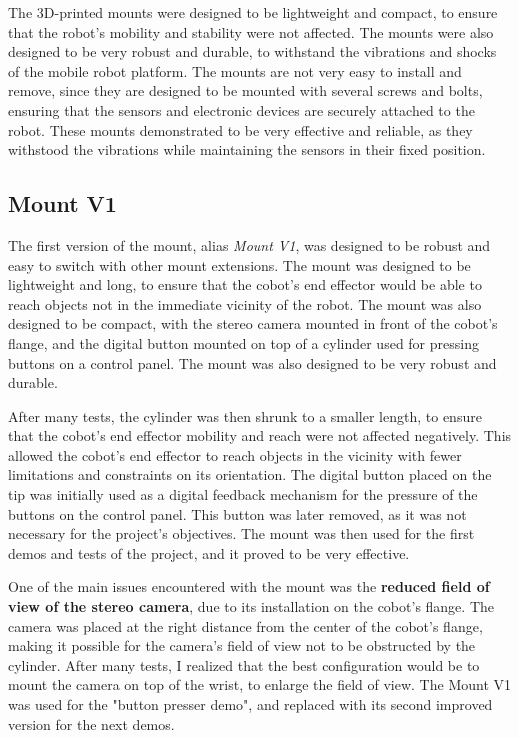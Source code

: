 The 3D-printed mounts were designed to be lightweight and compact, to ensure that the robot's mobility and stability
were not affected. The mounts were also designed to be very robust and durable, to withstand the vibrations and shocks
of the mobile robot platform. The mounts are not very easy to install and remove, since they are designed to be
mounted with several screws and bolts, ensuring that the sensors and electronic devices are securely attached to the robot.
These mounts demonstrated to be very effective and reliable, as they withstood the vibrations while maintaining
the sensors in their fixed position.

\subsection{Mount V1}


The first version of the mount, alias \textit{Mount V1}, was designed to be robust and easy to switch with other
mount extensions. The mount was designed to be lightweight and long, to ensure that the cobot's end effector
would be able to reach objects not in the immediate vicinity of the robot. The mount was also designed to be
compact, with the stereo camera mounted in front of the cobot's flange, and the digital button mounted on top
of a cylinder used for pressing buttons on a control panel. The mount was also designed to be very robust and durable.

After many tests, the cylinder was then shrunk to a smaller length, to ensure that the cobot's end effector
mobility and reach were not affected negatively. This allowed the cobot's end effector to reach objects
in the vicinity with fewer limitations and constraints on its orientation.
The digital button placed on the tip was initially used as a digital feedback mechanism for the pressure
of the buttons on the control panel. This button was later removed, as it was not necessary for the project's
objectives. The mount was then used for the first demos and tests of the project, and it proved to be very effective.

One of the main issues encountered with the mount was the \textbf{reduced field of view of the stereo camera}, due to its
installation on the cobot's flange. The camera was placed at the right distance from the center of the cobot's flange,
making it possible for the camera's field of view not to be obstructed by the cylinder.
After many tests, I realized that the best configuration would be to mount the camera on top of the wrist,
to enlarge the field of view. The Mount V1 was used for the "button presser demo", and replaced with its 
second improved version for the next demos.

